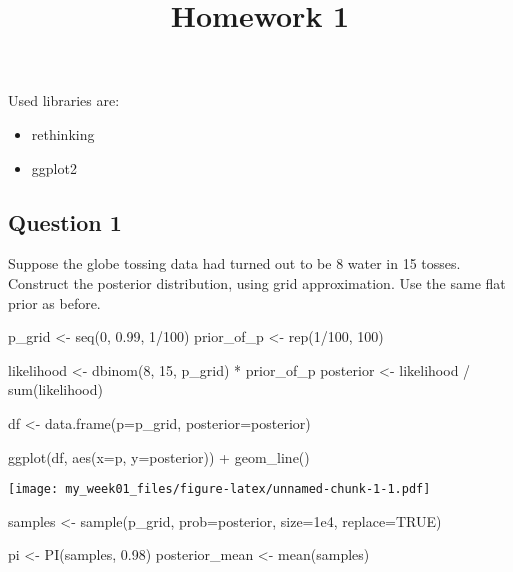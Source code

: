\documentclass[
]{article}
\title{Homework 1}
\author{}
\date{\vspace{-2.5em}}
\newenvironment{Shaded}{\begin{snugshade}}{\end{snugshade}}
\newcommand{\AttributeTok}[1]{\textcolor[rgb]{0.77,0.63,0.00}{#1}}
\newcommand{\ConstantTok}[1]{\textcolor[rgb]{0.00,0.00,0.00}{#1}}
\newcommand{\DecValTok}[1]{\textcolor[rgb]{0.00,0.00,0.81}{#1}}
\newcommand{\FloatTok}[1]{\textcolor[rgb]{0.00,0.00,0.81}{#1}}
\newcommand{\FunctionTok}[1]{\textcolor[rgb]{0.00,0.00,0.00}{#1}}
\newcommand{\NormalTok}[1]{#1}
\newcommand{\OtherTok}[1]{\textcolor[rgb]{0.56,0.35,0.01}{#1}}
\newcommand{\SpecialCharTok}[1]{\textcolor[rgb]{0.00,0.00,0.00}{#1}}
\begin{document}
\maketitle

Used libraries are:

\begin{itemize}
  \item rethinking
  \item ggplot2
\end{itemize}

\hypertarget{question-1}{%
\subsection{Question 1}\label{question-1}}

Suppose the globe tossing data had turned out to be 8 water in 15
tosses. Construct the posterior distribution, using grid approximation.
Use the same flat prior as before.

\begin{Shaded}
\begin{Highlighting}[]
\NormalTok{p\_grid }\OtherTok{\textless{}{-}} \FunctionTok{seq}\NormalTok{(}\DecValTok{0}\NormalTok{, }\FloatTok{0.99}\NormalTok{, }\DecValTok{1}\SpecialCharTok{/}\DecValTok{100}\NormalTok{)}
\NormalTok{prior\_of\_p }\OtherTok{\textless{}{-}} \FunctionTok{rep}\NormalTok{(}\DecValTok{1}\SpecialCharTok{/}\DecValTok{100}\NormalTok{, }\DecValTok{100}\NormalTok{)}

\NormalTok{likelihood }\OtherTok{\textless{}{-}} \FunctionTok{dbinom}\NormalTok{(}\DecValTok{8}\NormalTok{, }\DecValTok{15}\NormalTok{, p\_grid) }\SpecialCharTok{*}\NormalTok{ prior\_of\_p}
\NormalTok{posterior }\OtherTok{\textless{}{-}}\NormalTok{ likelihood }\SpecialCharTok{/} \FunctionTok{sum}\NormalTok{(likelihood)}

\NormalTok{df }\OtherTok{\textless{}{-}} \FunctionTok{data.frame}\NormalTok{(}\AttributeTok{p=}\NormalTok{p\_grid, }\AttributeTok{posterior=}\NormalTok{posterior)}

\FunctionTok{ggplot}\NormalTok{(df, }\FunctionTok{aes}\NormalTok{(}\AttributeTok{x=}\NormalTok{p, }\AttributeTok{y=}\NormalTok{posterior)) }\SpecialCharTok{+} \FunctionTok{geom\_line}\NormalTok{() }
\end{Highlighting}
\end{Shaded}

\texttt{[image: my\_week01\_files/figure-latex/unnamed-chunk-1-1.pdf]}

\begin{Shaded}
\begin{Highlighting}[]
\NormalTok{samples }\OtherTok{\textless{}{-}} \FunctionTok{sample}\NormalTok{(p\_grid, }\AttributeTok{prob=}\NormalTok{posterior, }\AttributeTok{size=}\FloatTok{1e4}\NormalTok{, }\AttributeTok{replace=}\ConstantTok{TRUE}\NormalTok{) }

\NormalTok{pi }\OtherTok{\textless{}{-}} \FunctionTok{PI}\NormalTok{(samples, }\FloatTok{0.98}\NormalTok{)}
\NormalTok{posterior\_mean }\OtherTok{\textless{}{-}} \FunctionTok{mean}\NormalTok{(samples)}
\end{Highlighting}
\end{Shaded}
\end{document}
